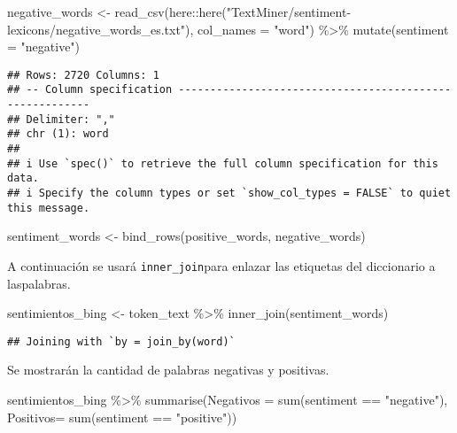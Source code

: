 \documentclass[
]{article}
\newenvironment{Shaded}{\begin{snugshade}}{\end{snugshade}}
\newcommand{\AttributeTok}[1]{\textcolor[rgb]{0.77,0.63,0.00}{#1}}
\newcommand{\FunctionTok}[1]{\textcolor[rgb]{0.00,0.00,0.00}{#1}}
\newcommand{\NormalTok}[1]{#1}
\newcommand{\OtherTok}[1]{\textcolor[rgb]{0.56,0.35,0.01}{#1}}
\newcommand{\SpecialCharTok}[1]{\textcolor[rgb]{0.00,0.00,0.00}{#1}}
\newcommand{\StringTok}[1]{\textcolor[rgb]{0.31,0.60,0.02}{#1}}
\begin{document}
\begin{Shaded}
\begin{Highlighting}[]
\NormalTok{negative\_words }\OtherTok{\textless{}{-}}
  \FunctionTok{read\_csv}\NormalTok{(here}\SpecialCharTok{::}\FunctionTok{here}\NormalTok{(}\StringTok{"TextMiner/sentiment{-}lexicons/negative\_words\_es.txt"}\NormalTok{), }\AttributeTok{col\_names =} \StringTok{"word"}\NormalTok{) }\SpecialCharTok{\%\textgreater{}\%}
  \FunctionTok{mutate}\NormalTok{(}\AttributeTok{sentiment =} \StringTok{"negative"}\NormalTok{)}
\end{Highlighting}
\end{Shaded}

\begin{verbatim}
## Rows: 2720 Columns: 1
## -- Column specification --------------------------------------------------------
## Delimiter: ","
## chr (1): word
## 
## i Use `spec()` to retrieve the full column specification for this data.
## i Specify the column types or set `show_col_types = FALSE` to quiet this message.
\end{verbatim}

\begin{Shaded}
\begin{Highlighting}[]
\NormalTok{sentiment\_words }\OtherTok{\textless{}{-}} \FunctionTok{bind\_rows}\NormalTok{(positive\_words, negative\_words)}
\end{Highlighting}
\end{Shaded}

A continuación se usará \texttt{inner\_join}para enlazar las etiquetas
del diccionario a laspalabras.

\begin{Shaded}
\begin{Highlighting}[]
\NormalTok{sentimientos\_bing }\OtherTok{\textless{}{-}}\NormalTok{ token\_text }\SpecialCharTok{\%\textgreater{}\%} \FunctionTok{inner\_join}\NormalTok{(sentiment\_words)}
\end{Highlighting}
\end{Shaded}

\begin{verbatim}
## Joining with `by = join_by(word)`
\end{verbatim}

Se mostrarán la cantidad de palabras negativas y positivas.

\begin{Shaded}
\begin{Highlighting}[]
\NormalTok{sentimientos\_bing }\SpecialCharTok{\%\textgreater{}\%}
  \FunctionTok{summarise}\NormalTok{(}\AttributeTok{Negativos =} \FunctionTok{sum}\NormalTok{(sentiment }\SpecialCharTok{==} \StringTok{"negative"}\NormalTok{), }
            \AttributeTok{Positivos=} \FunctionTok{sum}\NormalTok{(sentiment }\SpecialCharTok{==} \StringTok{"positive"}\NormalTok{))}
\end{Highlighting}
\end{Shaded}
\end{document}
